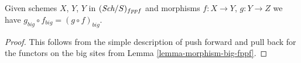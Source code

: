 \begin{lemma}
\label{lemma-composition-fppf}
Given schemes $X$, $Y$, $Y$ in $(\textit{Sch}/S)_{fppf}$
and morphisms $f : X \to Y$, $g : Y \to Z$ we have
$g_{big} \circ f_{big} = (g \circ f)_{big}$.
\end{lemma}

\begin{proof}
This follows from the simple description of push forward
and pull back for the functors on the big sites from
Lemma \ref{lemma-morphism-big-fppf}.
\end{proof}




































































































